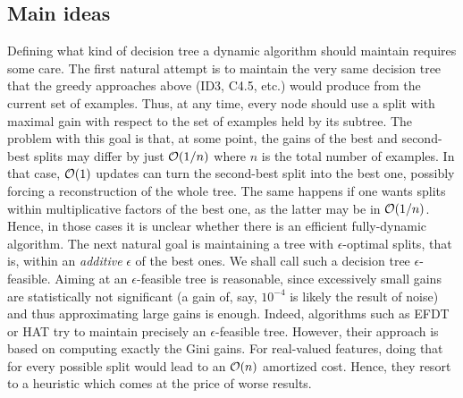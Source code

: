 \subsection{Main ideas}
Defining what kind of decision tree a dynamic algorithm should maintain requires some care. The first natural attempt is to maintain the very same decision tree that the greedy approaches above (ID3, C4.5, etc.) would produce from the current set of examples. Thus, at any time, every node should use a split with maximal gain with respect to the set of examples held by its subtree. The problem with this goal is that, at some point, the gains of the best and second-best splits may differ by just $\mathcal{O}(1/n)$ where $n$ is the total number of examples. In that case, $\mathcal{O}(1)$ updates can turn the second-best split into the best one, possibly forcing a reconstruction of the whole tree. The same happens if one wants splits within multiplicative factors of the best one, as the latter may be in $\mathcal{O}(1/n)$. Hence, in those cases it is unclear whether there is an efficient fully-dynamic algorithm.
The next natural goal is maintaining a tree with $\epsilon$-optimal splits, that is, within an \emph{additive} $\epsilon$ of the best ones.  We shall call such a decision tree $\epsilon$-feasible. Aiming at an $\epsilon$-feasible tree is reasonable, since excessively small gains are statistically not significant (a gain of, say, $10^{-4}$ is likely the result of noise) and thus approximating large gains is enough. 
Indeed, algorithms such as EFDT or HAT try to maintain precisely an $\epsilon$-feasible tree. However, their approach is based on computing exactly the Gini gains. For real-valued features, doing that for every possible split would lead to an $\mathcal{O}(n)$ amortized cost. Hence, they resort to a heuristic which comes at the price of worse results. 


